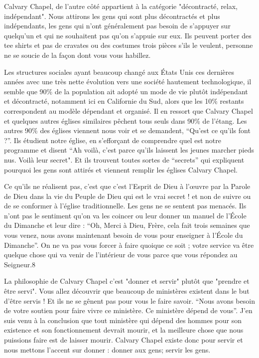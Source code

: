 Calvary Chapel, de l’autre côté appartient à la catégorie "décontracté, relax, indépendant". Nous attirons les gens qui
sont plus décontractés et plus indépendants, les gens qui n’ont généralement pas besoin de s’appuyer sur quelqu’un
et qui ne souhaitent pas qu’on s’appuie sur eux. Ils peuvent porter des tee shirts et pas de cravates ou des costumes
trois pièces s’ils le veulent, personne ne se soucie de la façon dont vous vous habillez.

Les structures sociales ayant beaucoup changé aux États Unis ces dernières années avec une très nette évolution vers
une société hautement technologique, il semble que 90\% de la population ait adopté un mode de vie plutôt
indépendant et décontracté, notamment ici en Californie du Sud, alors que les 10\% restants correspondent au modèle
dépendant et organisé. Il en ressort que Calvary Chapel et quelques autres églises similaires pêchent tous seuls dans
90\% de l'étang. Les autres 90\% des églises viennent nous voir et se demandent, “Qu’est ce qu’ils font ?”. Ils étudient
notre église, en s’efforçant de comprendre quel est notre programme et disent “Ah voilà, c’est parce qu’ils laissent les
jeunes marcher pieds nus. Voilà leur secret". Et ils trouvent toutes sortes de “secrets” qui expliquent pourquoi les
gens sont attirés et viennent remplir les églises Calvary Chapel.

Ce qu’ils ne réalisent pas, c’est que c’est l’Esprit de Dieu à l’œuvre par la Parole de Dieu dans la vie du Peuple de Dieu
qui est le vrai secret ! et non de suivre ou de se conformer à l’église traditionnelle. Les gens ne se sentent pas
menacés. Ils n’ont pas le sentiment qu’on va les coincer ou leur donner un manuel de l’École du Dimanche et leur
dire : “Oh, Merci à Dieu, Frère, cela fait trois semaines que vous venez, nous avons maintenant besoin de vous pour
enseigner à l’École du Dimanche”. On ne va pas vous forcer à faire quoique ce soit ; votre service va être quelque
chose qui va venir de l'intérieur de vous parce que vous répondez au Seigneur.8

La philosophie de Calvary Chapel c’est "donner et servir" plutôt que "prendre et être servi". Vous allez découvrir
que beaucoup de ministères existent dans le but d’être servis ! Et ils ne se gênent pas pour vous le faire savoir. “Nous
avons besoin de votre soutien pour faire vivre ce ministère. Ce ministère dépend de vous”. J’en suis venu à la
conclusion que tout ministère qui dépend des hommes pour son existence et son fonctionnement devrait mourir, et la
meilleure chose que nous puissions faire est de laisser mourir. Calvary Chapel existe donc pour servir et nous mettons
l’accent sur donner : donner aux gens; servir les gens.

